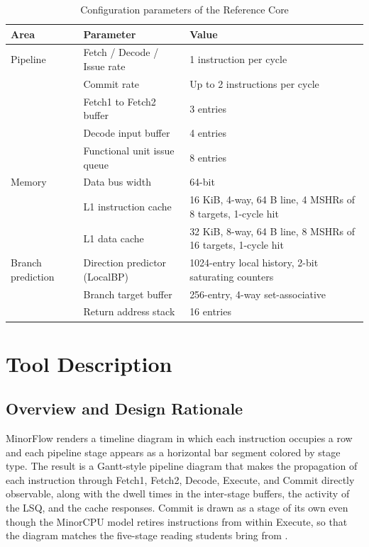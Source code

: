 \documentclass{ceurart}
\begin{document}
\begin{table}[!ht]
\centering
\caption{Configuration parameters of the Reference Core}
\label{tab:processor_specs}
\begin{tabularx}{\textwidth}{llX}
\toprule
\textbf{Area} & \textbf{Parameter} & \textbf{Value} \\
\midrule
Pipeline & Fetch / Decode / Issue rate & 1 instruction per cycle \\
         & Commit rate & Up to 2 instructions per cycle \\
         & Fetch1 to Fetch2 buffer & 3 entries \\
         & Decode input buffer & 4 entries \\
         & Functional unit issue queue & 8 entries \\
\midrule
Memory & Data bus width & 64-bit \\
       & L1 instruction cache & 16 KiB, 4-way, 64 B line, 4 MSHRs of 8 targets, 1-cycle hit \\
       & L1 data cache & 32 KiB, 8-way, 64 B line, 8 MSHRs of 16 targets, 1-cycle hit \\
\midrule
Branch prediction & Direction predictor (LocalBP) & 1024-entry local history, 2-bit saturating counters \\
                  & Branch target buffer & 256-entry, 4-way set-associative \\
                  & Return address stack & 16 entries \\
\bottomrule
\end{tabularx}
\end{table}

\section{Tool Description}
\label{sec:description}

\subsection{Overview and Design Rationale}

MinorFlow renders a timeline diagram in which each instruction occupies a row and each pipeline stage appears as a horizontal bar segment colored by stage type. The result is a Gantt-style pipeline diagram that makes the propagation of each instruction through Fetch1, Fetch2, Decode, Execute, and Commit directly observable, along with the dwell times in the inter-stage buffers, the activity of the LSQ, and the cache responses. Commit is drawn as a stage of its own even though the MinorCPU model retires instructions from within Execute, so that the diagram matches the five-stage reading students bring from \cite{patterson2020computer}.
\end{document}
